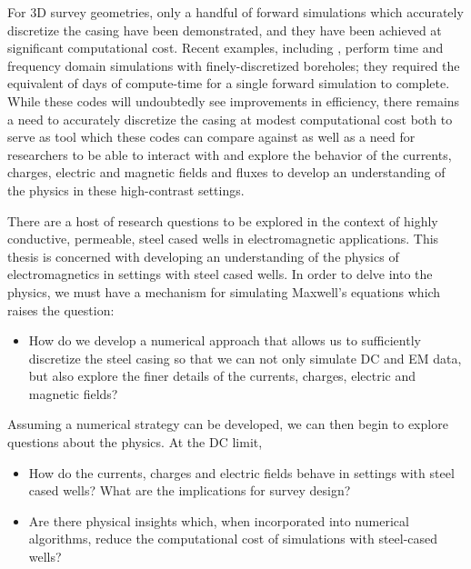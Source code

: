 For 3D survey geometries, only a handful of forward simulations which accurately discretize the casing have been demonstrated, and they have been achieved at significant computational cost. Recent examples, including \cite{Commer2015, Um2015, Puzyrev2017}, perform time and frequency domain simulations with finely-discretized boreholes; they required the equivalent of days of compute-time for a single forward simulation to complete. While these codes will undoubtedly see improvements in efficiency, there remains a need to accurately discretize the casing at modest computational cost both to serve as tool which these codes can compare against as well as a need for researchers to be able to interact with and explore the behavior of the currents, charges, electric and magnetic fields and fluxes to develop an understanding of the physics in these high-contrast settings.

There are a host of research questions to be explored in the context of highly conductive, permeable, steel cased wells in electromagnetic applications. This thesis is concerned with developing an understanding of the physics of electromagnetics in settings with steel cased wells. In order to delve into the physics, we must have a mechanism for simulating Maxwell's equations which raises the question:
\begin{itemize}
\item{How do we develop a numerical approach that allows us to sufficiently discretize the steel casing so that we can not only simulate DC and EM data, but also explore the finer details of the currents, charges, electric and magnetic fields?}
\end{itemize}

Assuming a numerical strategy can be developed, we can then begin to explore questions about the physics. At the DC limit,
\begin{itemize}
\item{How do the currents, charges and electric fields behave in settings with steel cased wells? What are the implications for survey design?}
\item{Are there physical insights which, when incorporated into numerical algorithms, reduce the computational cost of simulations with steel-cased wells?}
\end{itemize}

